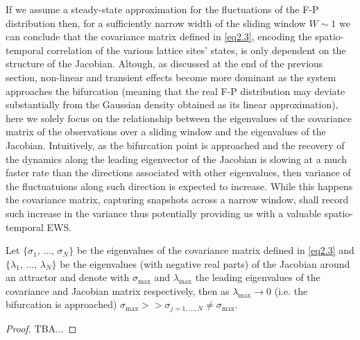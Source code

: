 \documentclass[../main.tex]{subfiles}
\begin{document}
If we assume a steady-state approximation for the fluctuations of the F-P distribution then, for a sufficiently narrow width of the sliding window $W\sim1$ we can conclude that the covariance matrix defined in \eqref{eq2.3}, encoding the spatio-temporal correlation of the various lattice sites' states, is only dependent on the structure of the Jacobian.
Altough, as discussed at the end of the previous section, non-linear and transient effects become more dominant as the system approaches the bifurcation (meaning that the real F-P distribution may deviate substantially from the Gaussian density obtained as its linear approximation), here we solely focus on the relationship between the eigenvalues of the covariance matrix of the observations over a sliding window and the eigenvalues of the Jacobian.
Intuitively, as the bifurcation point is approached and the recovery of the dynamics along the leading eigenvector of the Jacobian is slowing at a much faster rate than the directions associated with other eigenvalues, then variance of the fluctuatuions along such direction is expected to increase. 
While this happens the covariance matrix, capturing snapshots across a narrow window, shall record such increase in the variance thus potentially providing us with a valuable spatio-temporal EWS.
\begin{theorem}[label=thm2.1]{}{}
        Let $\{\sigma_{1},\,\dots,\,\sigma_{N}\}$ be the eigenvalues of the covariance matrix defined in \eqref{eq2.3} and $\{\lambda_{1},\,\dots,\,\lambda_{N}\}$ be the eigenvalues (with negative real parts) of the Jacobian around an attractor and denote with $\sigma_{\text{max}}$ and $\lambda_{\text{max}}$ the leading eigenvalues of the covariance and Jacobian matrix respectively, then as $\lambda_{\text{max}}\to 0$ (i.e. the bifurcation is approached) $\sigma_{\text{max}}>>\sigma_{j=1,\dots,N}\neq\sigma_{\text{max}}$. 
\end{theorem}
\begin{proof}
     TBA...
\end{proof}
\end{document}
